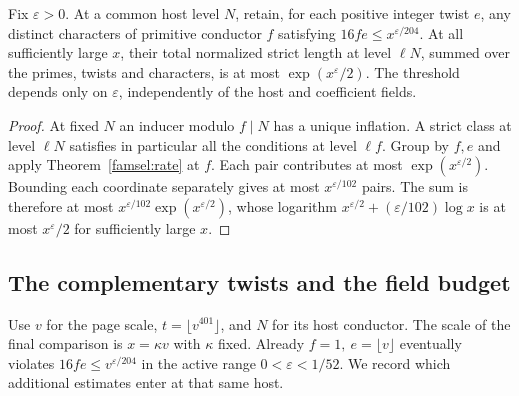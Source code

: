 \begin{corollary}\label{famsel:subwindow}
Fix \(\varepsilon>0\). At a common host level \(N\), retain, for each
positive integer twist \(e\), any distinct characters of primitive
conductor \(f\) satisfying \(16fe\le x^{\varepsilon/204}\).
At all sufficiently large \(x\), their total normalized strict length
at level \(\ell N\), summed over the primes, twists and characters,
is at most \(\exp(x^\varepsilon/2)\). The threshold depends only on
\(\varepsilon\), independently of the host and coefficient fields.
\end{corollary}
\begin{proof}
At fixed \(N\) an inducer modulo \(f\mid N\) has a unique inflation.
A strict class at level \(\ell N\) satisfies in particular all the
conditions at level \(\ell f\). Group by \(f,e\) and apply
Theorem~\ref{famsel:rate} at \(f\). Each pair contributes at most
\(\exp(x^{\varepsilon/2})\). Bounding each coordinate separately gives
at most \(x^{\varepsilon/102}\) pairs. The sum is therefore at most
\(x^{\varepsilon/102}\exp(x^{\varepsilon/2})\), whose logarithm
\(x^{\varepsilon/2}+(\varepsilon/102)\log x\) is at most
\(x^\varepsilon/2\) for sufficiently large \(x\).
\end{proof}

\subsection{The complementary twists and the field budget}\label{famsel:complement}
Use \(v\) for the page scale, \(t=\lfloor v^{401}\rfloor\), and \(N\)
for its host conductor. The scale of the final comparison is
\(x=\kappa v\) with \(\kappa\) fixed. Already \(f=1,\ e=\lfloor v\rfloor\)
eventually violates \(16fe\le v^{\varepsilon/204}\) in the active range
\(0<\varepsilon<1/52\). We record which additional estimates enter
at that same host.

